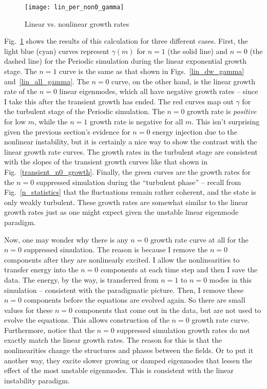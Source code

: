 \begin{figure}
\centerline{\texttt{[image: lin\_per\_non0\_gamma]}}
\caption{Linear vs. nonlinear growth rates}
\label{lin_per_non0_gamma}
\end{figure}

Fig.~\ref{lin_per_non0_gamma} shows the results of this calculation for three different cases. First, the light blue (cyan) curves represent $\gamma(m)$ for $n=1$ (the solid line)
and $n=0$ (the dashed line) for the Periodic simulation during the linear exponential growth stage. The $n=1$ curve is the same as that shown in Figs.~\ref{lin_dw_gamma} and~\ref{lin_all_gamma}.
The $n=0$ curve, on the other hand, is the linear growth rate of the $n=0$ linear eigenmodes, which all have negative growth rates -- since I take this after the transient growth has ended. 
The red curves map out $\gamma$ for the turbulent stage of the Periodic simulation. 
The $n=0$ growth rate is \emph{positive} for low $m$, while the $n=1$ growth rate is negative for all $m$. This isn't surprising given the
previous section's evidence for $n=0$ energy injection due to the nonlinear instability, but it is certainly a nice way to show the contrast with the linear growth rate curves.
The growth rates in the turbulent stage are consistent with the slopes of the transient growth curves like that shown in Fig.~\ref{transient_n0_growth}.
Finally, the green curves are the growth rates for the $n=0$ suppressed simulation during the ``turbulent phase'' -- recall from Fig.~\ref{n_statistics} that the fluctuations remain rather
coherent, and the state is only weakly turbulent.
These growth rates are somewhat similar to the linear growth rates just as one might expect given the unstable linear eigenmode paradigm. 

Now, one may wonder why there is any $n=0$ growth rate curve at all for the $n=0$ suppressed simulation. 
The reason is because I remove the $n=0$ components after they are nonlinearly excited. I allow the nonlinearities to transfer energy 
into the $n=0$ components at each time step and then I save the data. The energy, by the way, is transferred from $n=1$ to $n=0$ modes in this simulation -- consistent with the paradigmatic picture. 
Then, I remove these $n=0$ components before the equations are evolved again. So there are small values for these $n=0$ components that come out in the data, but are not used to evolve the equations. 
This allows construction of the $n=0$ growth rate curve.
Furthermore, notice that the $n=0$ suppressed simulation growth rates do not exactly match the linear growth rates. The reason for this is that the nonlinearities change the structures and
phases between the fields. Or to put it another way, they excite slower growing or damped eigenmodes that lessen the effect of the most unstable eigenmodes. This is consistent with the linear
instability paradigm.

